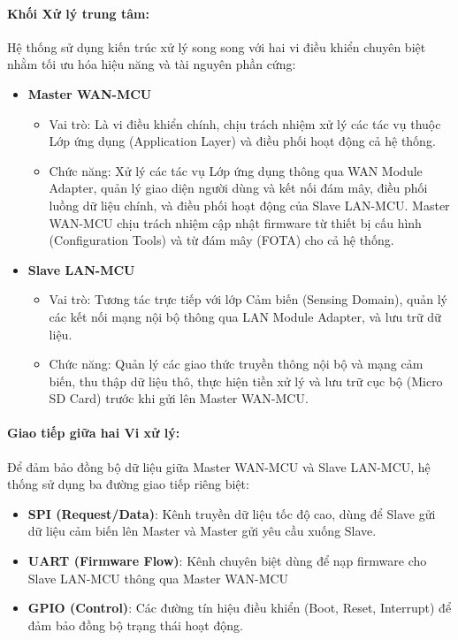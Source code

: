             \paragraph{Khối Xử lý trung tâm:}\par
                Hệ thống sử dụng kiến trúc xử lý song song với hai vi điều khiển chuyên biệt nhằm tối ưu hóa hiệu năng và tài nguyên phần cứng:
                \begin{itemize}
                    \item \textbf{Master WAN-MCU}
                    \begin{itemize}
                        \item Vai trò: Là vi điều khiển chính, chịu trách nhiệm xử lý các tác vụ thuộc Lớp ứng dụng (Application Layer) và điều phối hoạt động cả hệ thống.
                        \item Chức năng: Xử lý các tác vụ Lớp ứng dụng thông qua WAN Module Adapter, quản lý giao diện người dùng và kết nối đám mây, điều phối luồng dữ liệu chính, và điều phối hoạt động của Slave LAN-MCU. Master WAN-MCU chịu trách nhiệm cập nhật firmware từ thiết bị cấu hình (Configuration Tools) và từ đám mây (FOTA) cho cả hệ thống.
                    \end{itemize}
                    \item \textbf{Slave LAN-MCU}
                    \begin{itemize}
                        \item Vai trò: Tương tác trực tiếp với lớp Cảm biến (Sensing Domain), quản lý các kết nối mạng nội bộ thông qua LAN Module Adapter, và lưu trữ dữ liệu.
                        \item Chức năng: Quản lý các giao thức truyền thông nội bộ và mạng cảm biến, thu thập dữ liệu thô, thực hiện tiền xử lý và lưu trữ cục bộ (Micro SD Card) trước khi gửi lên Master WAN-MCU.
                    \end{itemize}
                \end{itemize}

            \paragraph{Giao tiếp giữa hai Vi xử lý:}\par
                Để đảm bảo đồng bộ dữ liệu giữa Master WAN-MCU và Slave LAN-MCU, hệ thống sử dụng ba đường giao tiếp riêng biệt:
                \begin{itemize}
                    \item \textbf{SPI (Request/Data)}: Kênh truyền dữ liệu tốc độ cao, dùng để Slave gửi dữ liệu cảm biến lên Master và Master gửi yêu cầu xuống Slave.
                    \item \textbf{UART (Firmware Flow)}: Kênh chuyên biệt dùng để nạp firmware cho Slave LAN-MCU thông qua Master WAN-MCU
                    \item \textbf{GPIO (Control)}: Các đường tín hiệu điều khiển (Boot, Reset, Interrupt) để đảm bảo đồng bộ trạng thái hoạt động.
                \end{itemize}

